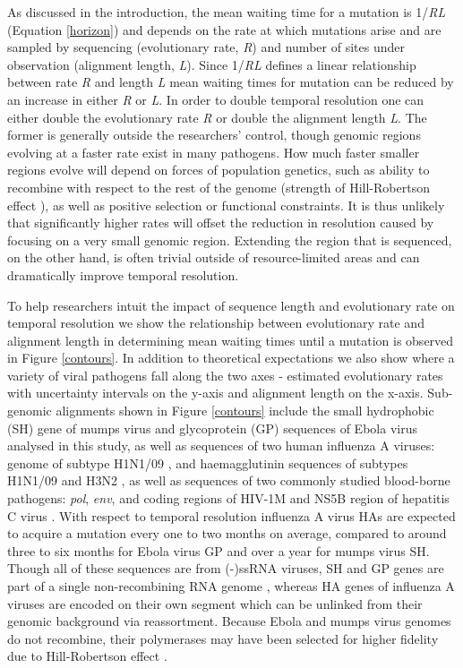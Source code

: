\documentclass{bmcart}
\begin{document}
As discussed in the introduction, the mean waiting time for a mutation is 1/\textit{RL} (Equation \ref{horizon}) and depends on the rate at which mutations arise and are sampled by sequencing (evolutionary rate, \textit{R}) and number of sites under observation (alignment length, \textit{L}).
Since 1/\textit{RL} defines a linear relationship between rate \textit{R} and length \textit{L} mean waiting times for mutation can be reduced by an increase in either \textit{R} or \textit{L}.
In order to double temporal resolution one can either double the evolutionary rate \textit{R} or double the alignment length \textit{L}.
The former is generally outside the researchers' control, though genomic regions evolving at a faster rate exist in many pathogens.
How much faster smaller regions evolve will depend on forces of population genetics, such as ability to recombine with respect to the rest of the genome (strength of Hill-Robertson effect \cite{hill_effect_1966}), as well as positive selection or functional constraints.
It is thus unlikely that significantly higher rates will offset the reduction in resolution caused by focusing on a very small genomic region.
Extending the region that is sequenced, on the other hand, is often trivial outside of resource-limited areas and can dramatically improve temporal resolution.

To help researchers intuit the impact of sequence length and evolutionary rate on temporal resolution we show the relationship between evolutionary rate and alignment length in determining mean waiting times until a mutation is observed in Figure \ref{contours}.
In addition to theoretical expectations we also show where a variety of viral pathogens fall along the two axes - estimated evolutionary rates with uncertainty intervals on the y-axis and alignment length on the x-axis.
Sub-genomic alignments shown in Figure \ref{contours} include the small hydrophobic (SH) gene of mumps virus \cite{cui_evolutionary_2017} and glycoprotein (GP) sequences of Ebola virus analysed in this study, as well as sequences of two human influenza A viruses: genome of subtype H1N1/09 \cite{hedge_real-time_2013}, and haemagglutinin sequences of subtypes H1N1/09 \cite{smith_origins_2009} and H3N2 \cite{rambaut_genomic_2008}, as well as sequences of two commonly studied blood-borne pathogens: \textit{pol}, \textit{env}, and coding regions of HIV-1M \cite{patino-galindo_substitution_2017} and NS5B region of hepatitis C virus \cite{magiorkinis_global_2009}.
With respect to temporal resolution influenza A virus HAs are expected to acquire a mutation every one to two months on average, compared to around three to six months for Ebola virus GP and over a year for mumps virus SH.
Though all of these sequences are from (-)ssRNA viruses, SH and GP genes are part of a single non-recombining RNA genome \cite{chare_phylogenetic_2003}, whereas HA genes of influenza A viruses are encoded on their own segment which can be unlinked from their genomic background via reassortment.
Because Ebola and mumps virus genomes do not recombine, their polymerases may have been selected for higher fidelity due to Hill-Robertson effect \cite{hill_effect_1966}.
\end{document}
